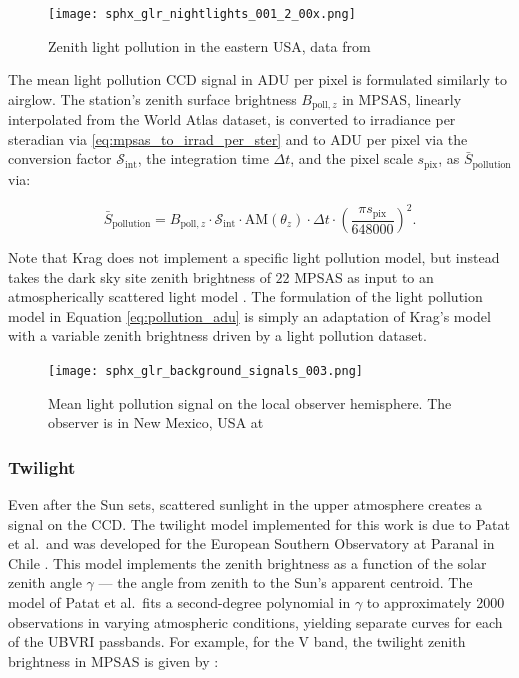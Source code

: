 \begin{figure}[ht]
  \centering
  \texttt{[image: sphx\_glr\_nightlights\_001\_2\_00x.png]}
  \caption{Zenith light pollution in the eastern USA, data from \cite{falchi2016_data}}
  \label{fig:pollution_data}
\end{figure}

The mean light pollution CCD signal in ADU per pixel is formulated similarly to airglow. The station's zenith surface brightness $B_{\mathrm{poll},z}$ in MPSAS, linearly interpolated from the World Atlas dataset, is converted to irradiance per steradian via \ref{eq:mpsas_to_irrad_per_ster} and to ADU per pixel via the conversion factor $\mathcal{S}_\mathrm{int}$, the integration time $\Delta t$, and the pixel scale $s_\mathrm{pix}$, as $\bar{S}_\mathrm{pollution}$ via:
 
\begin{equation} \label{eq:pollution_adu}
  \bar{S}_\mathrm{pollution} = B_{\mathrm{poll},z} \cdot \mathcal{S}_\mathrm{int} \cdot \textrm{AM}(\theta_z) \cdot \Delta t \cdot \left( \frac{\pi s_\mathrm{pix}}{648000} \right)^2.
\end{equation}

Note that Krag does not implement a specific light pollution model, but instead takes the dark sky site zenith brightness of $22$ MPSAS as input to an atmospherically scattered light model \cite{krag2003}. The formulation of the light pollution model in Equation \ref{eq:pollution_adu} is simply an adaptation of Krag's model with a variable zenith brightness driven by a light pollution dataset.

\begin{figure}[ht]
  \centering
  \texttt{[image: sphx\_glr\_background\_signals\_003.png]}
  \caption{Mean light pollution signal on the local observer hemisphere. The observer is in New Mexico, USA at
  \pogslla}
  \label{fig:pollution_hemi}
\end{figure}

\subsubsection{Twilight}

Even after the Sun sets, scattered sunlight in the upper atmosphere creates a signal on the CCD. The twilight model implemented for this work is due to Patat et al.\ and was developed for the European Southern Observatory at Paranal in Chile \cite{patat2006}. This model implements the zenith brightness as a function of the solar zenith angle $\gamma$ --- the angle from zenith to the Sun's apparent centroid. The model of Patat et al.\ fits a second-degree polynomial in $\gamma$ to approximately 2000 observations in varying atmospheric conditions, yielding separate curves for each of the UBVRI passbands. For example, for the V band, the twilight zenith brightness in MPSAS is given by \cite{patat2006}:

